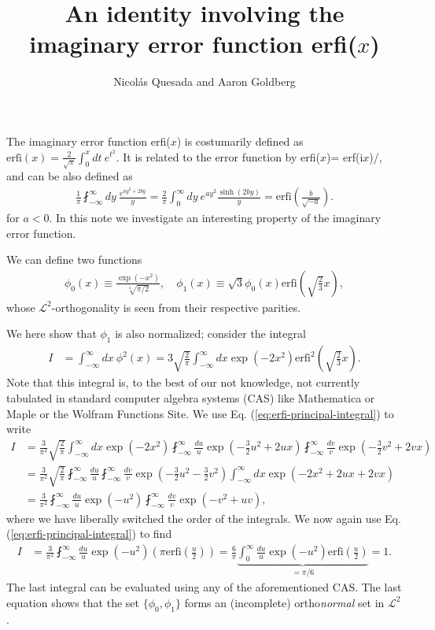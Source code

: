 \documentclass[11pt,letterpaper]{article}
\title{An identity involving the imaginary error function erfi($x$)}
\author{Nicol\'as Quesada and Aaron Goldberg}
\date{}
\newcommand{\eq}[1]{\begin{align}#1\end{align}}
\newcommand{\erfi}{\text{erfi}}
\newcommand{\iu}{\text{i}}
\begin{document}
\maketitle
The imaginary error function erfi($x$) is costumarily defined as $\erfi(x) = \frac{2}{\sqrt{\pi}} \int_0^x dt \ e^{t^2}$.
It is related to the error function by erfi($x$)= erf($\iu x$)/\iu, and can be also defined as
\eq{
\frac{1}{\pi} \fint_{-\infty}^{\infty} dy\ \frac{e^{a y^2 +2 b y}}{ y} = \frac{2}{\pi}\int_0^\infty dy \ e^{a y^2}\frac{\sinh(2 b y)}{ y}=\erfi\left(\frac{b}{\sqrt{-a}}\right).
\label{eq:erfi-principal-integral}
}
for $a<0$. In this note we investigate an interesting property of the imaginary error function.

We can define two functions
\eq{
  \phi_0(x)\equiv\frac{\exp\left(-x^2\right)}{\sqrt[4]{\pi/2}}, 
\quad   \phi_1(x)\equiv\sqrt{3}\phi_0\left(x\right)\erfi\left(\sqrt{\frac{2}{3}}x\right),
}
whose $\mathcal{L}^2$-orthogonality is seen from their respective parities. 

We here show that $\phi_1$ is also normalized; consider the integral
\eq{
  I&=\int_{-\infty}^\infty dx \ \phi^2\left(x\right) =3\sqrt{\frac{2}{\pi}}\int_{-\infty}^\infty dx  \exp\left(-2x^2\right)\erfi^2\left(\sqrt{\frac{2}{3}}x\right).
}
Note that this integral is, to the best of our not knowledge, not currently tabulated in standard computer algebra systems (CAS) like Mathematica or Maple or the Wolfram Functions Site. 
We use Eq. (\ref{eq:erfi-principal-integral}) to write
\begin{subequations}
\eq{
  I&=\frac{3}{\pi^2}\sqrt{\frac{2}{\pi}}\int_{-\infty}^\infty dx\exp\left(-2x^2\right)\fint_{-\infty}^\infty \frac{du}{u} \exp\left(-\frac{3}{2}u^2+2ux\right)\fint_{-\infty}^\infty \frac{dv}{v} \exp\left(-\frac{3}{2}v^2+2vx\right)\\
  &=\frac{3}{\pi^2}\sqrt{\frac{2}{\pi}}\fint_{-\infty}^\infty \frac{du}{u}\fint_{-\infty}^\infty \frac{dv}{v}
  \exp\left(-\frac{3}{2}u^2-\frac{3}{2}v^2\right) \int_{-\infty}^\infty dx \exp\left(-2x^2+2ux+2vx\right)\\
  &=\frac{3}{\pi^2}\fint_{-\infty}^\infty \frac{du}{u}\exp\left(-u^2\right)\fint_{-\infty}^\infty \frac{dv}{v}
  \exp\left(-v^2+uv\right),
}
\end{subequations}
where we have liberally switched the order of the integrals. We now again use Eq. (\ref{eq:erfi-principal-integral}) to find
\eq{
  I&=\frac{3}{\pi^2}\fint_{-\infty}^\infty \frac{du}{u}\exp\left(-u^2\right)\left(\pi\erfi\left(\frac{u}{2}\right)\right)=\frac{6}{\pi}\underbrace{\int_{0}^\infty \frac{du}{u}\exp\left(-u^2\right)\erfi\left(\frac{u}{2}\right)}_{=\pi/6}=1.
}
The last integral can be evaluated using any of the aforementioned CAS. The last equation shows that the set $\{\phi_0,\phi_1 \}$ forms an (incomplete) ortho\emph{normal} set in $\mathcal{L}^2$.
\end{document}
